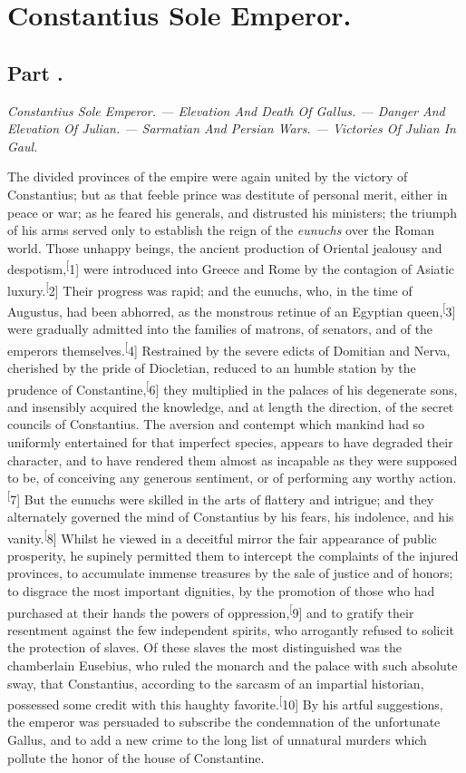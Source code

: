 \chapter{Constantius Sole Emperor.}
\section{Part \thesection.}

\textit{Constantius Sole Emperor. — Elevation And Death Of Gallus. — Danger
And Elevation Of Julian. — Sarmatian And Persian Wars. — Victories Of
Julian In Gaul.}
\vspace{\onelineskip}

The divided provinces of the empire were again united by the
victory of Constantius; but as that feeble prince was destitute
of personal merit, either in peace or war; as he feared his
generals, and distrusted his ministers; the triumph of his arms
served only to establish the reign of the \textit{eunuchs} over the
Roman world. Those unhappy beings, the ancient production of
Oriental jealousy and despotism,\textsuperscript[1] were introduced into Greece
and Rome by the contagion of Asiatic luxury.\textsuperscript[2] Their progress was
rapid; and the eunuchs, who, in the time of Augustus, had been
abhorred, as the monstrous retinue of an Egyptian queen,\textsuperscript[3] were
gradually admitted into the families of matrons, of senators, and
of the emperors themselves.\textsuperscript[4] Restrained by the severe edicts of
Domitian and Nerva, cherished by the pride of Diocletian, reduced
to an humble station by the prudence of Constantine,\textsuperscript[6] they
multiplied in the palaces of his degenerate sons, and insensibly
acquired the knowledge, and at length the direction, of the
secret councils of Constantius. The aversion and contempt which
mankind had so uniformly entertained for that imperfect species,
appears to have degraded their character, and to have rendered
them almost as incapable as they were supposed to be, of
conceiving any generous sentiment, or of performing any worthy
action.\textsuperscript[7] But the eunuchs were skilled in the arts of flattery
and intrigue; and they alternately governed the mind of
Constantius by his fears, his indolence, and his vanity.\textsuperscript[8] Whilst
he viewed in a deceitful mirror the fair appearance of public
prosperity, he supinely permitted them to intercept the
complaints of the injured provinces, to accumulate immense
treasures by the sale of justice and of honors; to disgrace the
most important dignities, by the promotion of those who had
purchased at their hands the powers of oppression,\textsuperscript[9] and to
gratify their resentment against the few independent spirits, who
arrogantly refused to solicit the protection of slaves. Of these
slaves the most distinguished was the chamberlain Eusebius, who
ruled the monarch and the palace with such absolute sway, that
Constantius, according to the sarcasm of an impartial historian,
possessed some credit with this haughty favorite.\textsuperscript[10] By his
artful suggestions, the emperor was persuaded to subscribe the
condemnation of the unfortunate Gallus, and to add a new crime to
the long list of unnatural murders which pollute the honor of the
house of Constantine.

